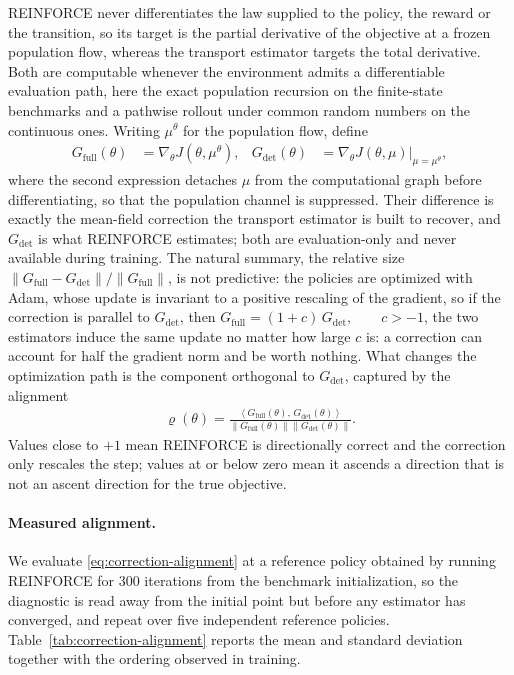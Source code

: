 REINFORCE never differentiates the law supplied to the policy, the reward or the transition, so its target is the partial derivative of the objective at a frozen population flow, whereas the transport estimator targets the total derivative. Both are computable whenever the environment admits a differentiable evaluation path, here the exact population recursion on the finite-state benchmarks and a pathwise rollout under common random numbers on the continuous ones. Writing $\mu^\theta$ for the population flow, define
\begin{align}
    G_{\mathrm{full}}(\theta) &= \nabla_\theta J\!\left(\theta,\mu^\theta\right), &
    G_{\mathrm{det}}(\theta) &= \nabla_\theta J\!\left(\theta,\mu\right)\Big|_{\mu=\mu^\theta},
    \label{eq:two-gradients}
\end{align}
where the second expression detaches $\mu$ from the computational graph before differentiating, so that the population channel is suppressed. Their difference is exactly the mean-field correction the transport estimator is built to recover, and $G_{\mathrm{det}}$ is what REINFORCE estimates; both are evaluation-only and never available during training. The natural summary, the relative size $\|G_{\mathrm{full}}-G_{\mathrm{det}}\|/\|G_{\mathrm{full}}\|$, is not predictive: the policies are optimized with Adam, whose update is invariant to a positive rescaling of the gradient, so if the correction is parallel to $G_{\mathrm{det}}$, then $G_{\mathrm{full}}=(1+c)\,G_{\mathrm{det}},\qquad c>-1$,
the two estimators induce the same update no matter how large $c$ is: a correction can account for half the gradient norm and be worth nothing. What changes the optimization path is the component orthogonal to $G_{\mathrm{det}}$, captured by the alignment
\begin{align}
    \varrho(\theta)
    =
    \frac{\left\langle G_{\mathrm{full}}(\theta),\,G_{\mathrm{det}}(\theta)\right\rangle}
    {\left\|G_{\mathrm{full}}(\theta)\right\|\left\|G_{\mathrm{det}}(\theta)\right\|}.
    \label{eq:correction-alignment}
\end{align}
Values close to $+1$ mean REINFORCE is directionally correct and the correction only rescales the step; values at or below zero mean it ascends a direction that is not an ascent direction for the true objective.

\paragraph{Measured alignment.}
We evaluate \eqref{eq:correction-alignment} at a reference policy obtained by running REINFORCE for $300$ iterations from the benchmark initialization, so the diagnostic is read away from the initial point but before any estimator has converged, and repeat over five independent reference policies. Table~\ref{tab:correction-alignment} reports the mean and standard deviation together with the ordering observed in training.

